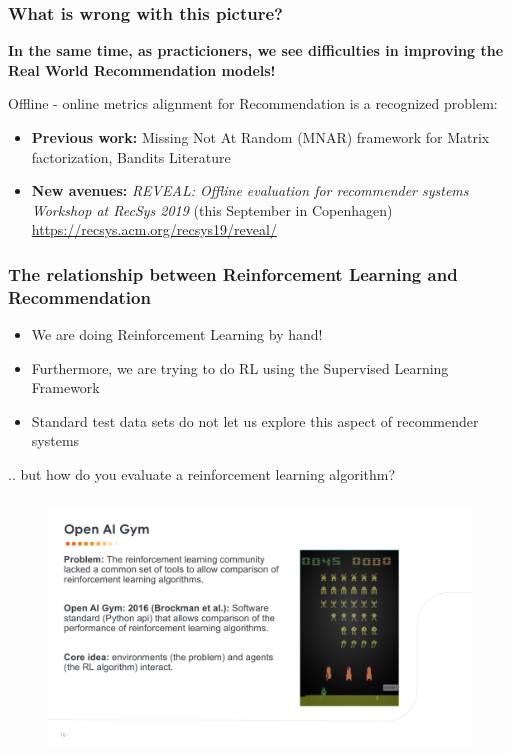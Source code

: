 \begin{frame}
  \frametitle{What is wrong with this picture?}
  
	\textbf{In the same time, as practicioners, we see difficulties in improving the Real World Recommendation models!}

	Offline - online metrics alignment for Recommendation is a recognized problem:
	\begin{itemize}
	\item \textbf{Previous work:} Missing Not At Random (MNAR) framework for Matrix factorization, Bandits Literature
	\item \textbf{New avenues:}  \emph{REVEAL: Offline evaluation for recommender systems Workshop at RecSys 2019} (this September in Copenhagen) \url{https://recsys.acm.org/recsys19/reveal/}
	\end{itemize}
  
\end{frame}


\begin{frame}
  \frametitle{The relationship between Reinforcement Learning and Recommendation}

\begin{itemize}
\item We are doing Reinforcement Learning by hand!
\pause
\item Furthermore, we are trying to do RL using the Supervised Learning Framework
\pause
\item Standard test data sets do not let us explore this aspect of recommender systems
\end{itemize}

\pause
.. but how do you evaluate a reinforcement learning algorithm?
\end{frame}

  



\begin{frame}
  \frametitle{}
 
 
   \begin{figure}[h!]
     \includegraphics[scale=0.39]{images/openai.png}
       \centering
       \label{motex1}
   \end{figure}
     
 \end{frame}




